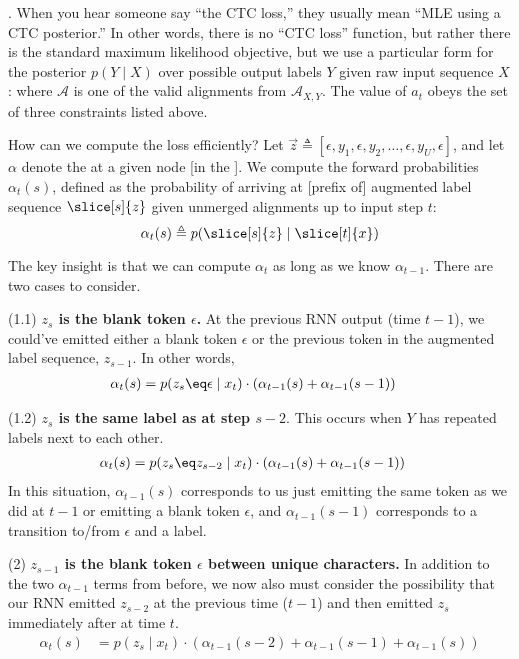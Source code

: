 \documentclass[11pt]{article}
\begin{document}
. When you hear someone say ``the CTC loss,'' they usually mean ``MLE using a CTC posterior.'' In other words, there is no ``CTC loss'' function, but rather there is the standard maximum likelihood objective, but we use a particular form for the posterior $p(Y \mid X)$ over possible output labels $Y$ given raw input sequence $X$:
where $\mathcal A$ is one of the valid alignments from $\mathcal{A}_{X, Y}$. The value of $a_t$ obeys the set of three constraints listed above.

How can we compute the loss efficiently? Let $\vec z \triangleq [\epsilon, y_1, \epsilon, y_2, \ldots, \epsilon, y_U, \epsilon]$, and let $\alpha$ denote the  at a given node [in the ]. We compute the forward probabilities $\alpha_t(s)$, defined as the probability of arriving at [prefix of] augmented label sequence $\slice[s]{z}$ given unmerged alignments up to input step $t$:
$$
\alpha_t(s) 
\triangleq p(\slice[s]{z} \mid \slice[t]{x})
$$



The key insight is that we can compute $\alpha_t$ as long as we know $\alpha_{t-1}$. There are two cases to consider.
\begin{compactenum}
	\item  (1.1) \textbf{$z_s$ is the blank token $\epsilon$.} At the previous RNN output (time $t - 1$), we could've emitted either a blank token $\epsilon$ or the previous token in the augmented label sequence, $z_{s-1}$. In other words, 
	\begin{align}
	\alpha_t(s) 
	&= p(z_s \eq \epsilon \mid  x_t) \cdot
	\left(   \alpha_{t - 1}(s) + \alpha_{t - 1}(s - 1) \right) 
	\end{align}
	
	\item (1.2) \textbf{$z_s$ is the same label as at step $s - 2$}. This occurs when $Y$ has repeated labels next to each other. 
	\begin{align}
	\alpha_t(s) 
	&= p(z_s \eq z_{s-2} \mid x_t) 
	\cdot \left(   \alpha_{t - 1}(s) + \alpha_{t - 1}(s - 1)   \right)
	\end{align}
	In this situation, $\alpha_{t-1}(s)$ corresponds to us just emitting the same token as we did at $t - 1$ or emitting a blank token $\epsilon$, and $\alpha_{t-1}(s - 1)$ corresponds to a transition to/from $\epsilon$ and a label. 
	
	\item (2) \textbf{$z_{s-1}$ is the blank token $\epsilon$ between unique characters.} In addition to the two $\alpha_{t-1}$ terms from before, we now also must consider the possibility that our RNN emitted $z_{s-2}$ at the previous time ($t-1$) and then emitted $z_s$ immediately after at time $t$.  
	\begin{align}
	\alpha_t(s)
	&= p(z_s \mid x_t) \cdot \left(
	\alpha_{t-1}(s-2) + \alpha_{t-1}(s-1) + \alpha_{t-1}(s)
	\right)
	\end{align}
\end{compactenum}
\end{document}
